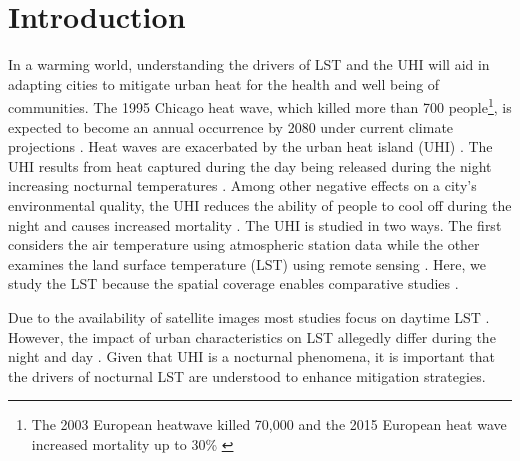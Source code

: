 \documentclass[final,3p,times,twocolumn,sort&compress]{elsarticle}
\begin{document}
\linenumbers

\section{Introduction}
In a warming world, understanding the drivers of LST and the UHI will aid in adapting cities to mitigate urban heat for the health and well being of communities.
The 1995 Chicago heat wave, which killed more than 700 people\footnote{The 2003 European heatwave killed 70,000 \cite{Robine 2008} and the 2015 European heat wave increased mortality up to 30\% \cite{Vicedo-Cabrera 2016 in Wicki} }, is expected to become an annual occurrence by 2080 under current climate projections \cite{klinenberg2015heat}. 
Heat waves are exacerbated by the urban heat island (UHI) \cite{Wicki2017-fv, Echevarria_Icaza2016-fr}.
The UHI results from heat captured during the day being released during the night increasing nocturnal temperatures \cite{Oke 1987, Landsberg1981, Rotach2005(bubble)}.
Among other negative effects on a city's environmental quality, the UHI reduces the ability of people to cool off during the night and causes increased mortality \cite{Stone2006}.
The UHI is studied in two ways.
The first considers the air temperature using atmospheric station data \cite{Scott2016-lc, etc} while the other examines the land surface temperature (LST) using remote sensing \cite{imhoff, Peng2012-iy, Peng2018-cp, Zhou2014-wc, etc.}. 
Here, we study the LST because the spatial coverage enables comparative studies \cite{Hung2006-qy}.

Due to the availability of satellite images most studies focus on daytime LST \cite{examples looking at day LST}.
However, the impact of urban characteristics on LST allegedly differ during the night and day \cite{Hung2006-qy, Chun2017-mm, Nichol2005-mm, Wicki2017-fv, Echevarria_Icaza2016-fr,Sobstyl2018-wt, Peng2012-iy, Zhou2014-wc, Zhao2017-cc}. 
Given that UHI is a nocturnal phenomena, it is important that the drivers of nocturnal LST are understood to enhance mitigation strategies. 
\end{document}

